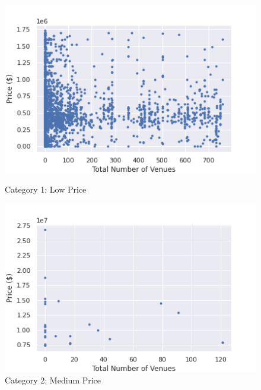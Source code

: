 \documentclass{article}
\begin{document}
\begin{figure}[ht]
	\begin{minipage}{0.3\linewidth}
		\includegraphics[width=\textwidth]{hs1.png}
		\caption{Category 1: Low Price}
		\label{fig:hs1}
	\end{minipage}%
	\hfill%
	\begin{minipage}{0.3\linewidth}
		\includegraphics[width=\textwidth]{hs2.png}
		\caption{Category 2: Medium Price}
		\label{fig:hs2}
	\end{minipage}%
	\hfill%
	\begin{minipage}{0.3\linewidth}

\end{minipage}
\end{figure}
\end{document}
